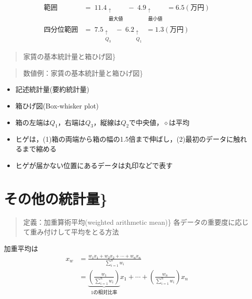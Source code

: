 \documentclass[
]{book}
\providecommand{\tightlist}{%
  \setlength{\itemsep}{0pt}\setlength{\parskip}{0pt}}
\theoremstyle{definition}
\theoremstyle{definition}
\theoremstyle{definition}
\theoremstyle{definition}
\theoremstyle{remark}
\begin{document}
\begin{align*}
\text{範囲}
&=\mathop{11.4}_{\substack{\uparrow \\ \text{最大値}}}
-\mathop{4.9}_{\substack{\uparrow \\ \text{最小値}}}
=6.5(\text{万円}) \\
%
\text{四分位範囲}
&=\mathop{7.5}_{\substack{\uparrow \\ Q_3}}
-\mathop{6.2}_{\substack{\uparrow \\ Q_1}}
=1.3(\text{万円})
\end{align*}

\begin{quote}
家賃の基本統計量と箱ひげ図\}
\end{quote}

\begin{quote}
数値例：家賃の基本統計量と箱ひげ図\}
\end{quote}

\begin{itemize}
\tightlist
\item
  記述統計量(要約統計量)
\end{itemize}

\begin{itemize}
\tightlist
\item
  箱ひげ図(Box-whisker plot)
\end{itemize}

\begin{itemize}
\tightlist
\item
  箱の左端は\(Q_1\)，右端は\(Q_3\)，縦線は\(Q_2\)で中央値，\(\diamond\)は平均
\item
  ヒゲは，(1)箱の両端から箱の幅の1.5倍まで伸ばし，(2)最初のデータに触れるまで縮める
\item
  ヒゲが届かない位置にあるデータは丸印などで表す
\end{itemize}

\hypertarget{ux305dux306eux4ed6ux306eux7d71ux8a08ux91cf-1}{%
\section{その他の統計量\}}\label{ux305dux306eux4ed6ux306eux7d71ux8a08ux91cf-1}}

\begin{quote}
定義：加重算術平均(weighted arithmetic mean)\}
各データの重要度に応じて重み付けして平均をとる方法
\end{quote}

加重平均は
\begin{align*}
x_w
&=\frac{w_1 x_1+w_2 x_2+\cdots+w_n x_n}{\sum_{i=1}^n w_i} \\
&=\underbrace{\left( \frac{w_1}{\sum_{i=1}^n w_i} \right)}_{1\text{の相対比率}}x_1
+\cdots+\left( \frac{w_n}{\sum_{i=1}^n w_i} \right) x_n
\end{align*}
\end{document}
